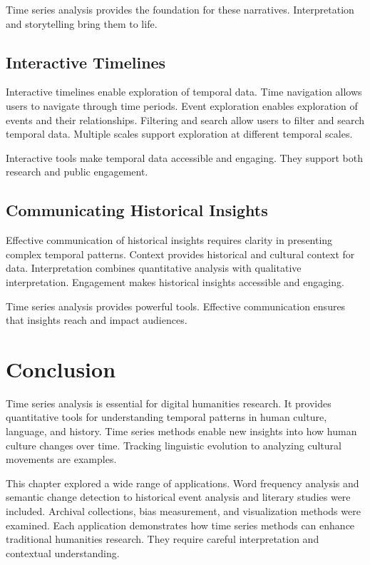 Time series analysis provides the foundation for these narratives. Interpretation and storytelling bring them to life.

\subsection{Interactive Timelines}

Interactive timelines enable exploration of temporal data. Time navigation allows users to navigate through time periods. Event exploration enables exploration of events and their relationships. Filtering and search allow users to filter and search temporal data. Multiple scales support exploration at different temporal scales.

Interactive tools make temporal data accessible and engaging. They support both research and public engagement.

\subsection{Communicating Historical Insights}

Effective communication of historical insights requires clarity in presenting complex temporal patterns. Context provides historical and cultural context for data. Interpretation combines quantitative analysis with qualitative interpretation. Engagement makes historical insights accessible and engaging.

Time series analysis provides powerful tools. Effective communication ensures that insights reach and impact audiences.

\section{Conclusion}

Time series analysis is essential for digital humanities research. It provides quantitative tools for understanding temporal patterns in human culture, language, and history. Time series methods enable new insights into how human culture changes over time. Tracking linguistic evolution to analyzing cultural movements are examples.

This chapter explored a wide range of applications. Word frequency analysis and semantic change detection to historical event analysis and literary studies were included. Archival collections, bias measurement, and visualization methods were examined. Each application demonstrates how time series methods can enhance traditional humanities research. They require careful interpretation and contextual understanding.

